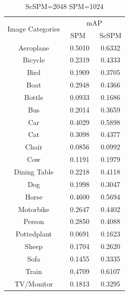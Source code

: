 \documentclass[conference]{IEEEtran}
\begin{document}
\begin{table}[ph]
  \centering
  \begin{tabular}{|c|c|c|}
    \hline
    \multirow{2}{*}{Image Categories} & \multicolumn{2}{c|}{mAP} \\
    \cline{2-3}
               & \ SPM\ \ & ScSPM \\
    \hline
     Aeroplane & 0.5010 & 0.6332 \\
    \hline
     Bicycle & 0.2319 & 0.4333 \\
     \hline
     Bird & 0.1909 & 0.3705 \\
     \hline
     Boat & 0.2948 & 0.4366 \\
     \hline
     Bottle & 0.0933 & 0.1686 \\
     \hline
     Bus & 0.2014 & 0.3659 \\
     \hline
     Car & 0.4029 & 0.5898 \\
     \hline
     Cat & 0.3098 & 0.4377 \\
     \hline
     Chair & 0.0856 & 0.0992 \\
     \hline
     Cow & 0.1191 & 0.1979 \\
     \hline
     Dining Table & 0.2218 & 0.4118 \\
     \hline
     Dog & 0.1998 & 0.3047 \\
     \hline
     Horse & 0.4600 & 0.5694 \\
     \hline
     Motorbike & 0.2647 & 0.4402 \\
     \hline
     Person & 0.2850 & 0.4088 \\
    \hline
     Pottedplant & 0.0691 & 0.1623 \\
     \hline
     Sheep & 0.1704 & 0.2620 \\
     \hline
     Sofa & 0.1455 & 0.3335 \\
     \hline
     Train & 0,4709 & 0.6107 \\
     \hline
     TV/Monitor & 0.1813 & 0.3295 \\
     \hline
  \end{tabular}
  \caption{ ScSPM=2048 SPM=1024 }
  \label{tablo}
\end{table}



\end{document}
